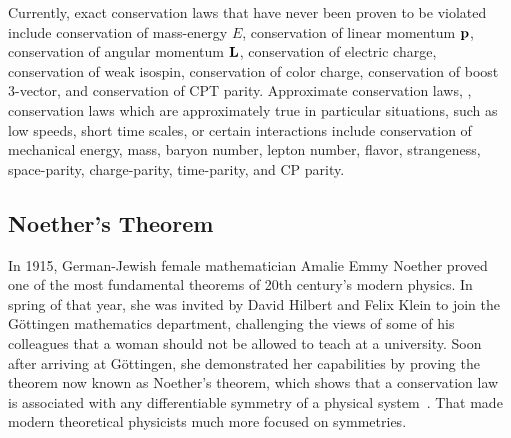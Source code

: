 Currently, exact conservation laws that have never been proven to be violated include conservation of mass-energy $E$, conservation of linear momentum $\vb{p}$, conservation of angular momentum $\vb{L}$, conservation of electric charge, conservation of weak isospin, conservation of color charge, conservation of boost 3-vector, and conservation of CPT parity. Approximate conservation laws, \ie, conservation laws which are approximately true in particular situations, such as low speeds, short time scales, or certain interactions include conservation of mechanical energy, mass, baryon number, lepton number, flavor, strangeness, space-parity, charge-parity, time-parity, and CP parity.

\subsection{Noether's Theorem}
\label{sec:noethers-theorem}

In 1915, German-Jewish female mathematician Amalie Emmy Noether proved one of the most fundamental theorems of 20th century's modern physics. In spring of that year, she was invited by David Hilbert and Felix Klein to join the Göttingen mathematics department, challenging the views of some of his colleagues that a woman should not be allowed to teach at a university. Soon after arriving at Göttingen, she demonstrated her capabilities by proving the theorem now known as Noether's theorem, which shows that a conservation law is associated with any differentiable symmetry of a physical system~\cite{Lederman2004-fl}. That made modern theoretical physicists much more focused on symmetries.

